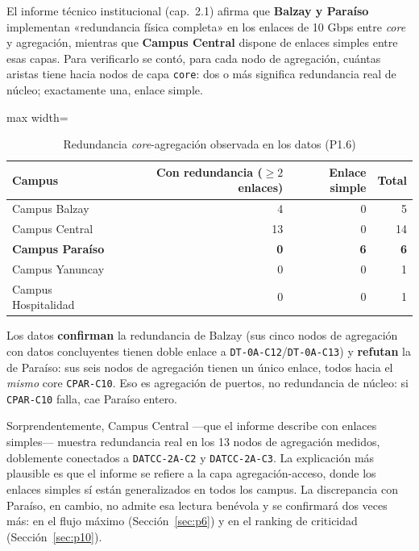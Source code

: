 \documentclass[10pt,a4paper]{extarticle}
\newcommand{\code}[1]{\texttt{\small #1}}
\begin{document}
El informe técnico institucional (cap.~2.1) afirma que \textbf{Balzay y Paraíso}
implementan «redundancia física completa» en los enlaces de 10 Gbps entre \textit{core} y
agregación, mientras que \textbf{Campus Central} dispone de enlaces simples entre esas
capas. Para verificarlo se contó, para cada nodo de agregación, cuántas aristas tiene
hacia nodos de capa \code{core}: dos o más significa redundancia real de núcleo; exactamente
una, enlace simple.

\begin{table}[H]
\centering
\caption{Redundancia \textit{core}-agregación observada en los datos (P1.6)}
\label{tab:redundancia}
\small
\begin{adjustbox}{max width=\textwidth}
\begin{tabular}{lrrr}
\toprule
\textbf{Campus} & \textbf{Con redundancia ($\ge 2$ enlaces)} & \textbf{Enlace simple} & \textbf{Total} \\
\midrule
Campus Balzay       &  4 & 0 &  5 \\
Campus Central      & 13 & 0 & 14 \\
\textbf{Campus Paraíso} & \textbf{0} & \textbf{6} & \textbf{6} \\
Campus Yanuncay     &  0 & 0 &  1 \\
Campus Hospitalidad &  0 & 0 &  1 \\
\bottomrule
\end{tabular}
\end{adjustbox}
\end{table}

Los datos \textbf{confirman} la redundancia de Balzay (sus cinco nodos de agregación con
datos concluyentes tienen doble enlace a \code{DT-0A-C12}/\code{DT-0A-C13}) y
\textbf{refutan} la de Paraíso: sus seis nodos de agregación tienen un único enlace, todos
hacia el \textit{mismo} core \code{CPAR-C10}. Eso es agregación de puertos, no redundancia
de núcleo: si \code{CPAR-C10} falla, cae Paraíso entero.

Sorprendentemente, Campus Central ---que el informe describe con enlaces simples--- muestra
redundancia real en los 13 nodos de agregación medidos, doblemente conectados a
\code{DATCC-2A-C2} y \code{DATCC-2A-C3}. La explicación más plausible es que el informe se
refiere a la capa agregación-acceso, donde los enlaces simples sí están generalizados en
todos los campus. La discrepancia con Paraíso, en cambio, no admite esa lectura benévola y
se confirmará dos veces más: en el flujo máximo (Sección~\ref{sec:p6}) y en el ranking de
criticidad (Sección~\ref{sec:p10}).
\end{document}
